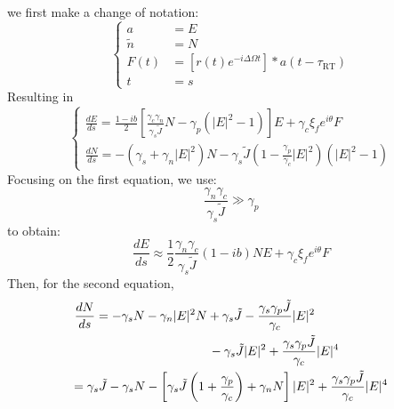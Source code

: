 %
we first make a change of notation:
%
\begin{equation*}
\left\{\begin{aligned}
a & =E \\
\tilde{n} & =N \\
F(t) & =\left[r(t) e^{-i \Delta \Omega t}\right] * a\left(t-\tau_\text{RT}\right) \\
t & =s
\end{aligned}\right.
\end{equation*}
%
Resulting in
%
\begin{equation*}
\left\{\begin{array}{l}
\displaystyle \frac{d E}{d s}=\frac{1-ib}{2}\left[\frac{\gamma_{c} \gamma_{n}}{\gamma_{s} \tilde{J}} N-\gamma_{p}\left(|E|^{2}-1\right)\right] E+\gamma_{c} \xi_{f} e^{i\theta} F \\
\displaystyle \frac{d N}{d s}=-\left(\gamma_{s}+\gamma_{n}|E|^{2}\right) N-\gamma_{s} \tilde{J}\left(1-\frac{\gamma_{p}}{\gamma_{c}}|E|^{2}\right)\left(|E|^{2}-1\right)
\end{array}\right.
\end{equation*}
%
Focusing on the first equation, we use:
%
\begin{equation*}
    \frac{\gamma_{n}\gamma_{c}}{\gamma_{s} \tilde{J}} \gg \gamma_{p}
\end{equation*}
%
to obtain:
%
\begin{equation*}
    \frac{d E}{d s} \approx \frac{1}{2} \frac{\gamma_n \gamma_c}{\gamma_{s} \tilde{J}}(1-ib) N E+ \gamma_c \xi_{f} e^{i\theta} F
\end{equation*}
%
Then, for the second equation,
%
\begin{align*}
\displaystyle \frac{d N}{d s} &= -\gamma_s N - \gamma_n|E|^{2} N + \gamma_{s} \tilde{J} - \frac{\gamma_{s} \gamma_{p} \tilde{J}}{\gamma_{c}}|E|^{2}\\
&\hspace{3.2cm} - \gamma_s \tilde{J}|E|^2 + \frac{\gamma_s \gamma_p \tilde{J}} {\gamma_{c}}|E|^{4}\\
&\hspace{-0.7cm} =\gamma_{s} \tilde{J}-\gamma_{s} N-\left[\gamma_{s} \tilde{J}\left(1+\frac{\gamma_{p}}{\gamma_{c}}\right)+\gamma_{n} N\right]|E|^{2}+\frac{\gamma_{s} \gamma_{p} \tilde{J}}{\gamma_{c}}|E|^{4}
\end{align*}
